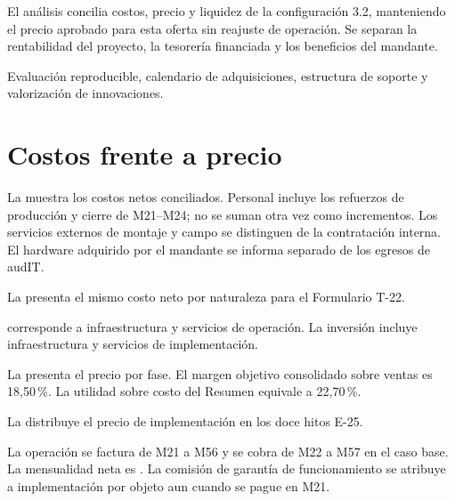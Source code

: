 \begin{resumenApertura}
El análisis concilia costos, precio y liquidez de la configuración 3.2, manteniendo el precio
aprobado para esta oferta sin reajuste de operación. Se separan la rentabilidad del proyecto,
la tesorería financiada y los beneficios del mandante.
\begin{recibe}
\item Evaluación reproducible, calendario de adquisiciones, estructura de soporte y valorización de innovaciones.
\end{recibe}
\end{resumenApertura}

\section{Costos frente a precio}\label{sec:eco-costo-precio}
La  muestra los costos netos conciliados. Personal incluye los refuerzos de
producción y cierre de M21--M24; no se suman otra vez como incrementos. Los servicios externos
de montaje y campo se distinguen de la contratación interna. El hardware adquirido por el
mandante se informa separado de los egresos de audIT.


La  presenta el mismo costo neto por naturaleza para el Formulario T-22.


 corresponde a infraestructura y servicios de operación. La
inversión incluye infraestructura y servicios de implementación.

La  presenta el precio por fase. El margen objetivo consolidado sobre ventas
es 18,50\,\%. La utilidad sobre costo del Resumen equivale a 22,70\,\%.


La  distribuye el precio de implementación en los doce hitos E-25.

\tablaHitosPago

La operación se factura de M21 a M56 y se cobra de M22 a M57 en el caso base.
La mensualidad neta es . La comisión de garantía
de funcionamiento se atribuye a implementación por objeto aun cuando se pague en M21.

